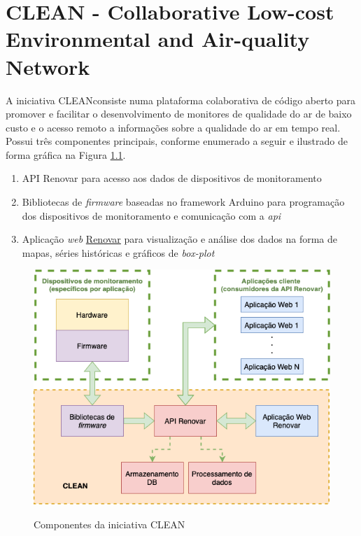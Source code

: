 \chapter{CLEAN - Collaborative Low-cost Environmental and Air-quality Network}\label{cap:clean-initiative}

A iniciativa CLEAN\footnotemark[3] consiste numa plataforma colaborativa de código aberto para promover e facilitar o desenvolvimento de monitores de qualidade do ar de baixo custo e o acesso remoto a informações sobre a qualidade do ar em tempo real. Possui três componentes principais, conforme enumerado a seguir e ilustrado de forma gráfica na Figura \ref{fig:clean-structure}.

\begin{enumerate}
    \item API Renovar para acesso aos dados de dispositivos de monitoramento
    \item Bibliotecas de \textit{firmware} baseadas no framework Arduino para programação dos dispositivos de monitoramento e comunicação com a \textit{api}
    \item Aplicação \textit{web} \href{http://renovar.lcqar.ufsc.br/}{Renovar} para visualização e análise dos dados na forma de mapas, séries históricas e gráficos de \textit{box-plot}
\end{enumerate}

\begin{figure}[h]
    \centering
    \caption{Componentes da iniciativa CLEAN}
    \includegraphics[width=0.80\linewidth]{chapters//2-CLEAN//Figuras/Estrutura CLEAN.png}
    \label{fig:clean-structure}
\end{figure}

